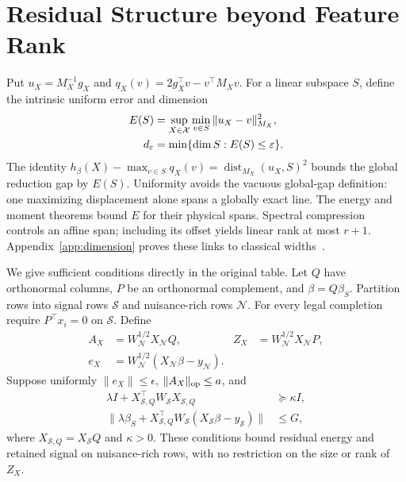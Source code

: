\section{Residual Structure beyond Feature Rank}\label{sec:structure}
Put $u_X=M_X^{-1}g_X$ and $q_X(v)=2g_X^\top v-v^\top M_Xv$. For a linear subspace $S$, define the intrinsic uniform error and dimension
\begin{align}
 E(S)&=\sup_{X\in\mathcal X}\min_{v\in S}\|u_X-v\|_{M_X}^2,\nonumber\\
 d_\varepsilon&=\min\{\dim S:E(S)\leq\varepsilon\}.\label{eq:intrinsic}
\end{align}
The identity $h_\beta(X)-\max_{v\in S}q_X(v)=\operatorname{dist}_{M_X}(u_X,S)^2$ bounds the global reduction gap by $E(S)$. Uniformity avoids the vacuous global-gap definition: one maximizing displacement alone spans a globally exact line. The energy and moment theorems bound $E$ for their physical spans. Spectral compression controls an affine span; including its offset yields linear rank at most $r+1$. Appendix~\ref{app:dimension} proves these links to classical widths~\citep{binev2011}.

We give sufficient conditions directly in the original table. Let $Q$ have orthonormal columns, $P$ be an orthonormal complement, and $\beta=Q\beta_S$. Partition rows into signal rows $\mathcal S$ and nuisance-rich rows $\mathcal N$. For every legal completion require $P^\top x_i=0$ on $\mathcal S$. Define
\begin{align*}
 A_X&=W_{\mathcal N}^{1/2}X_{\mathcal N}Q,&
 Z_X&=W_{\mathcal N}^{1/2}X_{\mathcal N}P,\\
 e_X&=W_{\mathcal N}^{1/2}(X_{\mathcal N}\beta-y_{\mathcal N}).
\end{align*}
Suppose uniformly $\|e_X\|\leq\epsilon$, $\|A_X\|_{\mathrm{op}}\leq a$, and
\begin{align*}
 \lambda I+X_{\mathcal S,Q}^\top W_{\mathcal S}X_{\mathcal S,Q}&\succeq\kappa I,\\
 \|\lambda\beta_S+X_{\mathcal S,Q}^\top W_{\mathcal S}
       (X_{\mathcal S}\beta-y_{\mathcal S})\|&\leq G,
\end{align*}
where $X_{\mathcal S,Q}=X_{\mathcal S}Q$ and $\kappa>0$. These conditions bound residual energy and retained signal on nuisance-rich rows, with no restriction on the size or rank of $Z_X$.


